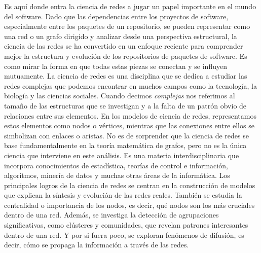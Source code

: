 Es aquí donde entra la ciencia de redes\cite{barabasi2016network} a jugar un papel importante en el mundo del software.
Dado que las dependencias entre los proyectos de software, especialmente entre los paquetes de un repositorio,
se pueden representar como una red o un grafo dirigido y analizar desde una perspectiva estructural, la ciencia de
las redes se ha convertido en un enfoque reciente para comprender mejor la estructura y evolución \cite{7962360} de los
repositorios de paquetes de software. Es como mirar la forma en que todas estas piezas se conectan y se influyen mutuamente.
La ciencia de redes es una disciplina que se dedica a estudiar las redes complejas que podemos encontrar en muchos campos como la tecnología,
la biología y las ciencias sociales. Cuando decimos \textit{complejas} nos referimos al tamaño de las estructuras que se investigan y a la
falta de un patrón obvio de relaciones entre sus elementos. En los modelos de ciencia de redes, representamos estos elementos como nodos o vértices, mientras que las conexiones entre ellos se simbolizan con enlaces o aristas.
No es de sorprender que la ciencia de redes se base fundamentalmente en la teoría matemática de grafos, pero no es la única ciencia que
interviene en este análisis.
Es una materia interdisciplinaria que incorpora conocimientos de estadística, teorías de control e información, algoritmos,
minería de datos y muchas otras áreas de la informática.
Los principales logros de la ciencia de redes se centran en la construcción de modelos que explican la síntesis y evolución de las redes reales.
También se estudia la centralidad o importancia de los nodos, es decir, qué nodos son los más cruciales dentro de una red.
Además, se investiga la detección de agrupaciones significativas, como clústeres y comunidades, que revelan patrones interesantes dentro de una red.
Y por si fuera poco, se exploran fenómenos de difusión, es decir, cómo se propaga la información a través de las redes.


